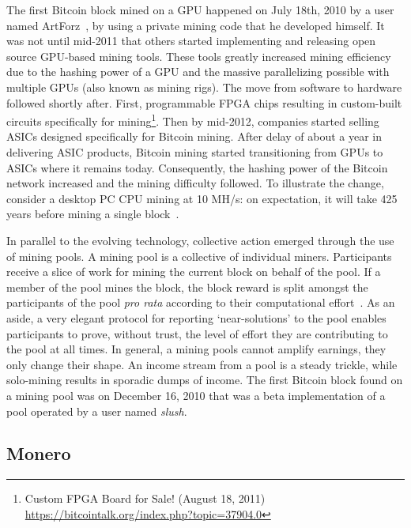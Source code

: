 The first Bitcoin block mined on a GPU happened on July 18th, 2010 by a user named ArtForz~\cite{bitcoinhistory}, by using a private mining code that he developed himself. It was not until mid-2011 that others started implementing and releasing open source GPU-based mining tools. These tools greatly increased mining efficiency due to the hashing power of a GPU and the massive parallelizing possible with multiple GPUs (also known as mining rigs). The move from software to hardware followed shortly after. First, programmable FPGA chips resulting in custom-built circuits specifically for mining\footnote{Custom FPGA Board for Sale! (August 18, 2011) \url{https://bitcointalk.org/index.php?topic=37904.0}}. Then by mid-2012, companies started selling ASICs designed specifically for Bitcoin mining. After delay of about a year in delivering ASIC products, Bitcoin mining started transitioning from GPUs to ASICs where it remains today. Consequently, the hashing power of the Bitcoin network increased and the mining difficulty followed. To illustrate the change, consider a desktop PC CPU mining at 10 MH/s: on expectation, it will take 425 years before mining a single block~\cite{huang2014botcoin}. 

In parallel to the evolving technology, collective action emerged through the use of mining pools. A mining pool is a collective of individual miners. Participants receive a slice of work for mining the current block on behalf of the pool. If a member of the pool mines the block, the block reward is split amongst the participants of the pool \textit{pro rata} according to their computational effort~\cite{rosenfeld2011analysis}. As an aside, a very elegant protocol for reporting `near-solutions' to the pool enables participants to prove, without trust, the level of effort they are contributing to the pool at all times. In general, a mining pools cannot amplify earnings, they only change their shape. An income stream from a pool is a steady trickle, while solo-mining results in sporadic dumps of income. The first Bitcoin block found on a mining pool was on December 16, 2010 that was a beta implementation of a pool operated by a user named \textit{slush}.

\subsection{Monero}

